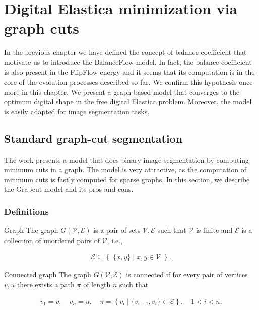 \chapter{Digital Elastica minimization via graph cuts}
\label{chapter:graphflow}

In the previous chapter we have defined the concept of balance coefficient that motivate us to introduce the BalanceFlow model. In fact, the balance coefficient is also present in the FlipFlow energy and it seems that its computation is in the core of the evolution processes described so far. We confirm this hypothesis once more in this chapter. We present a graph-based model that converges to the optimum digital shape in the free digital Elastica problem. Moreover, the model is easily adapted for image segmentation tasks.

\section{Standard graph-cut segmentation}
The work \cite{} presents a model that does binary image segmentation by computing minimum cuts in a graph. The model is very attractive, as the computation of minimum cuts is fastly computed for sparse graphs. In this section, we describe the Grabcut model and its pros and cons. 

\subsection{Definitions}

\begin{definition}{Graph}
The graph $G(\mathcal{V},\mathcal{E})$ is a pair of sets $\mathcal{V},\mathcal{E}$ such that $\mathcal{V}$ is finite and $\mathcal{E}$ is a collection of unordered pairs of $\mathcal{V}$, i.e., 

\begin{align*}
\mathcal{E} \subseteq  \left\{ \; \{x,y\} \; | \; x,y \in \mathcal{V} \; \right\}.
\end{align*}

\end{definition}

\begin{definition}{Connected graph}
The graph $G(\mathcal{V},\mathcal{E})$ is connected if for every pair of vertices $v,u$ there exists a path $\pi$ of length $n$ such that

\begin{align*}
	v_1 = v, \quad v_n = u, \quad 	\pi = \left\{ v_i \; | \; \{v_{i-1},v_{i}\} \subset \mathcal{E} \right\},\quad  1<i<n.
\end{align*}
\end{definition}

